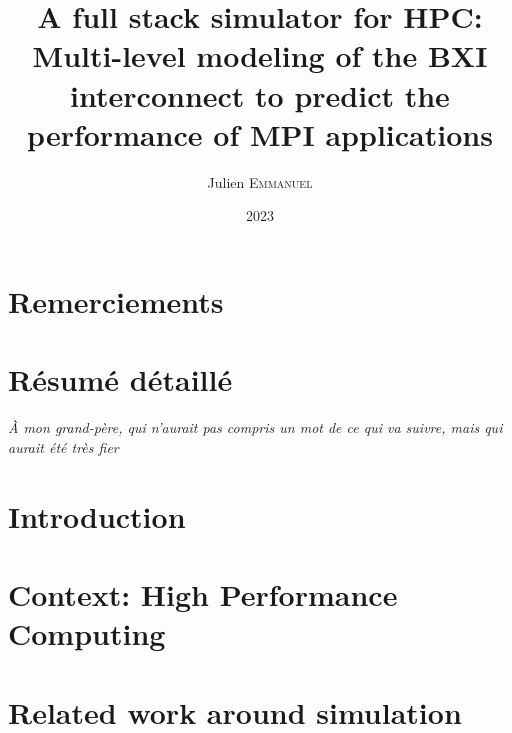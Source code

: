 \documentclass[11pt,a4paper,twoside]{book}
\title{A full stack simulator for HPC: Multi-level modeling of the BXI
interconnect to predict the performance of MPI applications}
\author{Julien \textsc{Emmanuel}}
\date{2023}
\newif\ifdraft
\begin{document}
\frontmatter %

\ifdraft
\maketitle
\else

\fi



\chapter*{Remerciements}



\chapter*{Résumé détaillé}



\cleardoublepage


\vspace*{7cm}
\begin{flushright}
\parbox[r]{5.6cm}{\raggedleft\textit{À mon grand-père, qui n'aurait pas compris un mot de ce qui va suivre, mais qui aurait été très fier}}
\end{flushright}


\tableofcontents

\mainmatter %

\chapter{Introduction}
\label{chap:intro}



\chapter{Context: High Performance Computing}
\label{chap:context_hpc}



\chapter{Related work around simulation}
\label{chap:biblio_simu}
\end{document}
